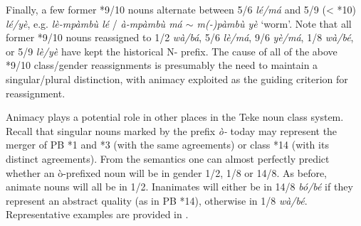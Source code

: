 \documentclass[output=paper,,modfonts,nonflat]{langsci/langscibook}
\begin{document}
Finally, a few former *9/10 nouns alternate between 5/6 \textit{lé/má} and 5/9 (< *10) \textit{lé/yè}, e.g. \textit{lè-mpàmbù lé} / \textit{à-mpàmbù má $\sim$ m(-)pàmbù yè} `worm’. Note that all former *9/10 nouns reassigned to 1/2 \textit{wà/bá}, 5/6 \textit{lè/má}, 9/6 \textit{yè/má}, 1/8 \textit{wà/bé}, or 5/9 \textit{lè/yè} have kept the historical N- prefix. The cause of all of the above *9/10 class/gender reassignments is presumably the need to maintain a singular/plural distinction, with animacy exploited as the guiding criterion for reassignment.

Animacy plays a potential role in other places in the Teke noun class system. Recall that singular nouns marked by the prefix \textit{ò-} today may represent the merger of PB *1 and *3 (with the same agreements) or class *14 (with its distinct agreements). From the semantics one can almost perfectly predict whether an ò-prefixed noun will be in gender 1/2, 1/8 or 14/8. As before, animate nouns will all be in 1/2. Inanimates will either be in 14/8 \textit{bó/bé} if they represent an abstract quality (as in PB *14), otherwise in 1/8 \textit{wà/bé}. Representative examples are provided in .

\end{document}
